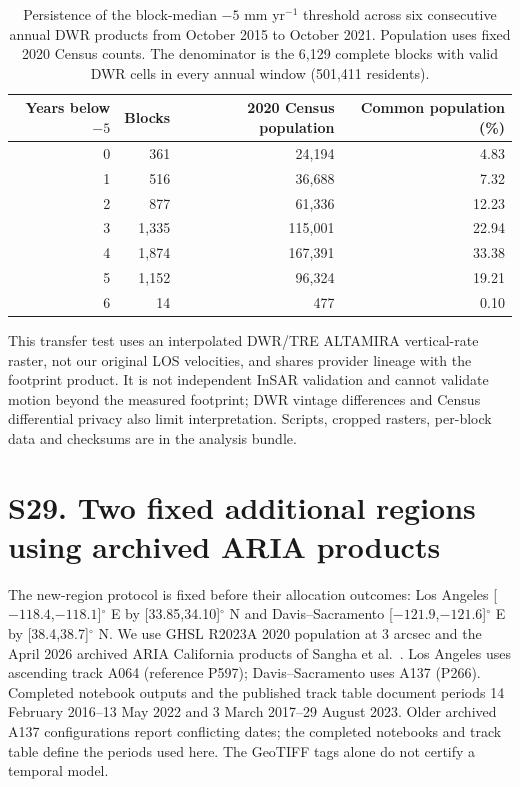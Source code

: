 \documentclass[10pt,a4paper]{article}
\begin{document}
\begin{table}[htbp]\centering\small
\caption{Persistence of the block-median $-5$ mm yr$^{-1}$ threshold across six consecutive annual DWR products from October 2015 to October 2021. Population uses fixed 2020 Census counts. The denominator is the 6,129 complete blocks with valid DWR cells in every annual window (501,411 residents).}
\begin{tabular}{rrrr}\toprule
Years below $-5$ & Blocks & 2020 Census population & Common population (\%) \\\midrule
0 & 361 & 24,194 & 4.83 \\
1 & 516 & 36,688 & 7.32 \\
2 & 877 & 61,336 & 12.23 \\
3 & 1,335 & 115,001 & 22.94 \\
4 & 1,874 & 167,391 & 33.38 \\
5 & 1,152 & 96,324 & 19.21 \\
6 & 14 & 477 & 0.10 \\
\bottomrule
\end{tabular}
\end{table}

This transfer test uses an interpolated DWR/TRE ALTAMIRA vertical-rate raster, not our original LOS velocities, and shares provider lineage with the footprint product. It is not independent InSAR validation and cannot validate motion beyond the measured footprint; DWR vintage differences and Census differential privacy also limit interpretation. Scripts, cropped rasters, per-block data and checksums are in the analysis bundle.



\section*{S29. Two fixed additional regions using archived ARIA products}
The new-region protocol is fixed before their allocation outcomes: Los Angeles [$-118.4$,$-118.1$]$^\circ$ E by [33.85,34.10]$^\circ$ N and Davis--Sacramento [$-121.9$,$-121.6$]$^\circ$ E by [38.4,38.7]$^\circ$ N. We use GHSL R2023A 2020 population at 3 arcsec and the April 2026 archived ARIA California products of Sangha et al.\ \citep{sangha2026california,sangha2026data}. Los Angeles uses ascending track A064 (reference P597); Davis--Sacramento uses A137 (P266). Completed notebook outputs and the published track table document periods 14 February 2016--13 May 2022 and 3 March 2017--29 August 2023. Older archived A137 configurations report conflicting dates; the completed notebooks and track table define the periods used here. The GeoTIFF tags alone do not certify a temporal model.
\end{document}
